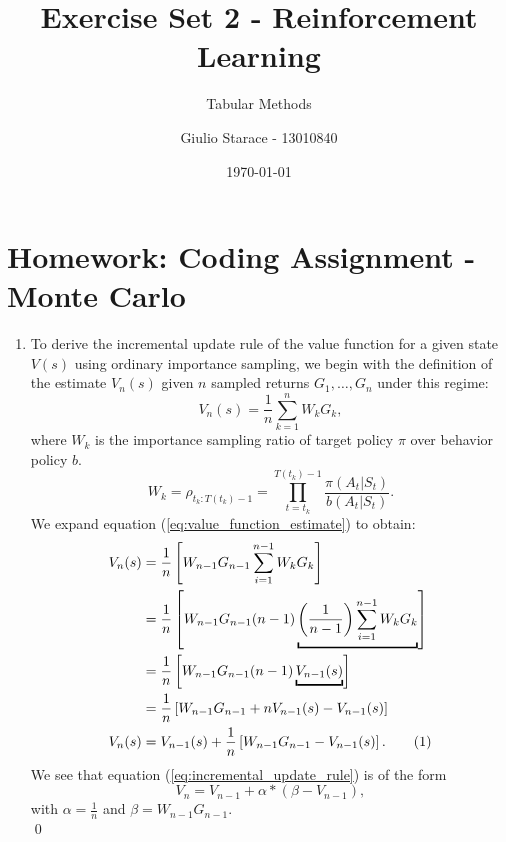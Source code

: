 \documentclass{article}
\title{Exercise Set 2 - Reinforcement Learning}
\subtitle{Tabular Methods}
\author{Giulio Starace - 13010840}
\date{\today}
\newcommand\numberthis{\addtocounter{equation}{1}\tag{\theequation}}
\begin{document}
\maketitle
\section*{Homework: Coding Assignment - Monte Carlo}
\begin{enumerate}
	\item To derive the incremental update rule of the value function for a given state $V(s)$ using
	      ordinary importance sampling, we begin with the definition of the estimate $V_n(s)$ given $n$
	      sampled returns $G_1, \dots, G_n$ under this regime:
	      \begin{equation}\label{eq:value_function_estimate}
		      V_n(s) = \frac{1}{n} \sum^n_{k=1} W_k G_k,
	      \end{equation}
	      where $W_k$ is the importance sampling ratio of target policy $\pi$ over behavior policy $b$.
	      \begin{equation}
		      W_k = \rho_{t_k:T(t_k)-1} = \prod_{t=t_k}^{T(t_k)-1} \frac{\pi(A_t|S_t)}{b(A_t|S_t)}.
	      \end{equation}
	      We expand equation (\ref{eq:value_function_estimate}) to obtain:
	      \begin{align*}
		      V_n(s) & = \frac{1}{n} \left[W_{n-1} G_{n-1} \sum^{n-1}_{i=1}W_kG_k\right]                  \\
		             & = \frac{1}{n} \left[W_{n-1} G_{n-1}
		      (n-1)\underbracket{\left(\frac{1}{n-1}\right)\sum^{n-1}_{i=1}W_kG_k}\right]                 \\
		             & =  \frac{1}{n} \left[W_{n-1} G_{n-1}(n-1)\underbracket{V_{n-1}(s)} \right]         \\
		             & = \frac{1}{n} \left[W_{n-1} G_{n-1}+ n V_{n-1}(s) - V_{n-1}(s)\right]              \\
		      V_n(s) & =  V_{n-1}(s) + \frac{1}{n} \left[W_{n-1} G_{n-1} - V_{n-1}(s)\right]. \numberthis
		      \label{eq:incremental_update_rule}
	      \end{align*}
	      We see that equation (\ref{eq:incremental_update_rule}) is of the form
	      \begin{equation}
		      V_n = V_{n-1} + \alpha * \left(\beta - V_{n-1}\right),
	      \end{equation}
	      with $\alpha = \frac{1}{n}$ and $\beta = W_{n-1} G_{n-1}$.  \\ \qed


\end{enumerate}
\end{document}
